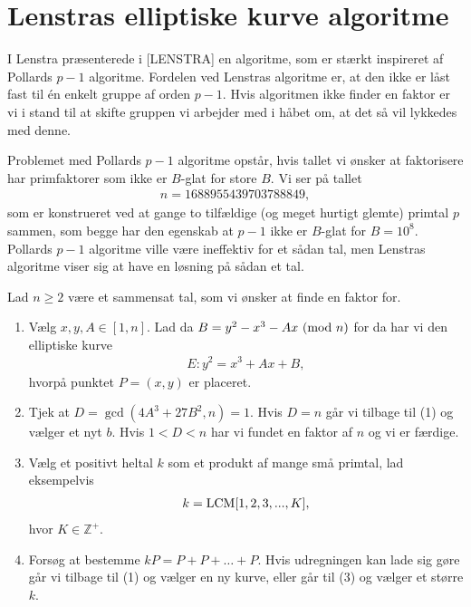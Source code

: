 \section{Lenstras elliptiske kurve algoritme}

I \cite{Lenstra}
Lenstra præsenterede i [LENSTRA] en algoritme, som er stærkt inspireret af Pollards $p-1$ algoritme. Fordelen ved Lenstras algoritme er, at den ikke er låst fast til én enkelt gruppe af orden $p-1$. Hvis algoritmen ikke finder en faktor er vi i stand til at skifte gruppen vi arbejder med i håbet om, at det så vil lykkedes med denne.

Problemet med Pollards $p-1$ algoritme opstår, hvis tallet vi ønsker at faktorisere har primfaktorer som ikke er $B$-glat for store $B$. Vi ser på tallet 
\begin{align*}
	n =  1688955439703788849,
\end{align*}
som er konstrueret ved at gange to tilfældige (og meget hurtigt glemte) primtal $p$ sammen, som begge har den egenskab at $p-1$ ikke er $B$-glat for $B=10^8$. Pollards $p-1$ algoritme ville være ineffektiv for et sådan tal, men Lenstras algoritme viser sig at have en løsning på sådan et tal.


\begin{algorithm}
Lad $n \geq 2$ være et sammensat tal, som vi ønsker at finde en faktor for.
\begin{enumerate}
	\item Vælg $x, y, A \in [1, n]$. Lad da $B = y^2 - x^3 - Ax \ (\mathrm{mod} \ n)$ for da har vi den elliptiske kurve
	\begin{align*}
		E : y^2 = x^3 + Ax + B, 
	\end{align*}
	hvorpå punktet $P=(x, y)$ er placeret.
	\item Tjek at $D = \gcd(4A^3 + 27B^2, n) = 1$. Hvis $D=n$ går vi tilbage
	til (1) og vælger et nyt $b$. Hvis $1 < D < n$ har vi fundet en faktor af $n$ og vi er færdige.
	\item Vælg et positivt heltal $k$ som et produkt af mange små primtal, lad eksempelvis
	\begin{align*}
		k = \mathrm{LCM}[1, 2, 3, ..., K],
	\end{align*}
	hvor $K \in \mathbb{Z}^+$.
	\item Forsøg at bestemme $kP = P + P + \ldots + P$. Hvis udregningen kan lade sig gøre går vi tilbage til (1) og 
	vælger en ny kurve, eller går til (3) og vælger et større $k$.
\end{enumerate}
\end{algorithm}

